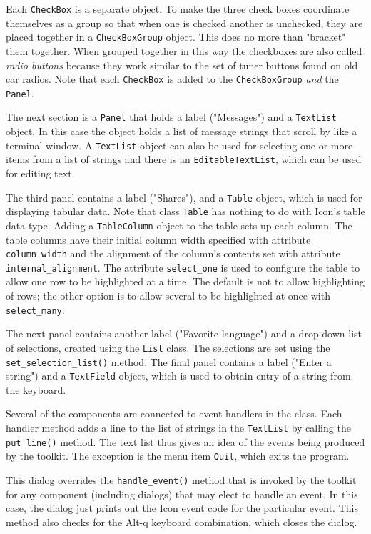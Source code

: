 Each \texttt{CheckBox} is a separate object. To make the three check
boxes coordinate themselves as a group so that when one is checked
another is unchecked, they are placed together in a
\texttt{CheckBoxGroup} object. This does no more than
"bracket" them together. When grouped
together in this way the checkboxes are also called \textit{radio buttons} because they work similar to the set of
tuner buttons found on old car radios. Note that each
\texttt{CheckBox} is added to the \texttt{CheckBoxGroup} \textit{and}
the \texttt{Panel}.

The next section is a \texttt{Panel} that holds a label
("Messages") and a \texttt{TextList}
object. In this case the object holds a list of message
strings that scroll by like a terminal window. A \texttt{TextList}
object can also be used for selecting one or more items from a list of
strings and there is an \texttt{EditableTextList},
which can be used for editing text.

The third panel contains a label ("Shares"),
and a \texttt{Table} object, which is used for displaying tabular data.
Note that class \texttt{Table} has nothing to do with
Icon's table data type. Adding a \texttt{TableColumn}
object to the table sets up each column. The table columns have their
initial column width specified with attribute \texttt{column\_width}
and the alignment of the column's contents set with
attribute \texttt{internal\_alignment}. The attribute
\texttt{select\_one} is used to configure the table to allow one row to
be highlighted at a time. The default is not to allow highlighting of
rows; the other option is to allow several to be highlighted at once
with \texttt{select\_many}.

The next panel contains another label ("Favorite
language") and a drop-down list of selections, created
using the \texttt{List} class. The selections are set using the
\texttt{set\_selection\_list()} method. The final panel contains a
label ("Enter a string") and a
\texttt{TextField} object, which is used to obtain entry of a string
from the keyboard.

Several of the components are connected to event handlers in the class.
Each handler method adds a line to the list of strings in the
\texttt{TextList} by calling the \texttt{put\_line()} method. The text
list thus gives an idea of the events being produced by the toolkit.
The exception is the menu item \texttt{Quit}, which exits the
program.

This dialog overrides the \texttt{handle\_event()} method that is
invoked by the toolkit for any component (including dialogs)
that may elect to handle an event. In this case, the dialog just
prints out the Icon event code for the particular event. This method
also checks for the Alt-q keyboard combination, which closes the
dialog.

